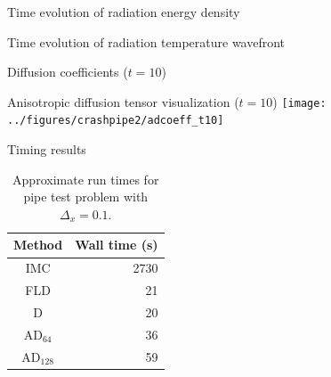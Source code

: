 \documentclass{beamer}
\begin{document}
\begin{frame}{Time evolution of radiation energy density}

\centering
\hspace{-1in}%
%
\only<2>{}%
\only<3>{}%
\only<4>{}%
%
\hspace{-.35in}
%
%
%
%
%
\hspace{-1in}
\par
  
\vspace{-\baselineskip}\small
{}%
%
%
%
%
\end{frame}

\begin{frame}{Time evolution of radiation temperature wavefront}
  \centering%
  \par
\end{frame}
\begin{frame}{Diffusion coefficients ($t=10$)}
  \centering%
  \par
\end{frame}
\begin{frame}{Anisotropic diffusion tensor visualization ($t=10$)}
  \centering%
  \texttt{[image: ../figures/crashpipe2/adcoeff\_t10]}%
  \par
\end{frame}
\begin{frame}{Timing results}
  \begin{table}[htb]
    \centering
    \begin{tabular}{cr}
      Method & Wall time (s) \\ \hline
      IMC & 2730 \\
      FLD & 21 \\
      D   & 20 \\
      AD$_{64}$ & 36 \\
      AD$_{128}$ & 59
    \end{tabular}
    \caption{Approximate run times for pipe test problem with $\Delta_x=0.1$.}
    \label{tab:pipeTiming}
  \end{table}
\end{frame}
\end{document}
